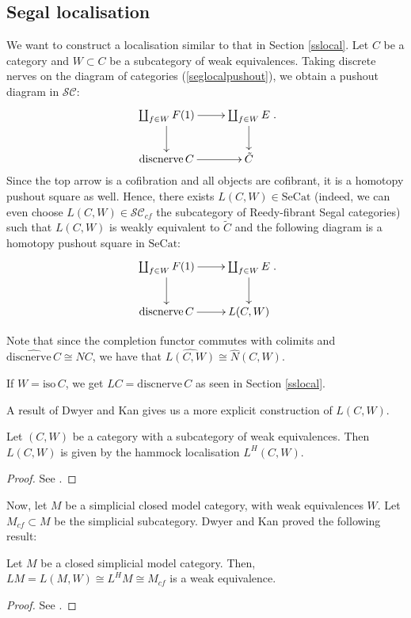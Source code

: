 \begin{refsection}
\subsection{Segal localisation}
We want to construct a localisation similar to that in Section \ref{sslocal}. Let $C$ be a category and $W\subset C$ be a subcategory of weak equivalences. Taking discrete nerves on the diagram of categories (\ref{seglocalpushout}), we obtain a pushout diagram in $\mathcal{SC}$:
$$\xymatrix{\coprod_{f\in W}F(1)\ar[r]\ar[d]&\coprod_{f\in W}E\ar[d]\\\mathrm{discnerve}\,C\ar[r]&\tilde C}.$$
Since the top arrow is a cofibration and all objects are cofibrant, it is a homotopy pushout square as well. Hence, there exists $L(C,W)\in\mathrm{SeCat}$ (indeed, we can even choose $L(C,W)\in\mathcal{SC}_{cf}$ the subcategory of Reedy-fibrant Segal categories) such that $L(C,W)$ is weakly equivalent to $\tilde C$ and the following diagram is a homotopy pushout square in $\mathrm{SeCat}$:
$$\xymatrix{\coprod_{f\in W}F(1)\ar[r]\ar[d]&\coprod_{f\in W}E\ar[d]\\\mathrm{discnerve}\,C\ar[r]&L(C,W)}.$$

Note that since the completion functor commutes with colimits and $\widehat{\mathrm{discnerve}\,C}\cong NC$, we have that $\widehat{L(C,W)}\cong\hat N(C,W)$.

If $W=\mathrm{iso}\,C$, we get $LC=\mathrm{discnerve}\,C$ as seen in Section \ref{sslocal}.

A result of Dwyer and Kan gives us a more explicit construction of $L(C,W)$.

\begin{thm}
Let $(C,W)$ be a category with a subcategory of weak equivalences. Then $L(C,W)$ is given by the hammock localisation $L^H(C,W)$.
\end{thm}
\begin{proof}
See \cite{dkcomputing}.
\end{proof}

Now, let $M$ be a simplicial closed model category, with weak equivalences $W$. Let $M_{cf}\subset M$ be the simplicial subcategory. Dwyer and Kan proved the following result:

\begin{thm}
Let $M$ be a closed simplicial model category. Then, $LM=L(M,W)\cong L^HM\cong M_{cf}$ is a weak equivalence.
\end{thm}
\begin{proof}
See \cite{dkfunction}.
\end{proof}


\end{refsection}
